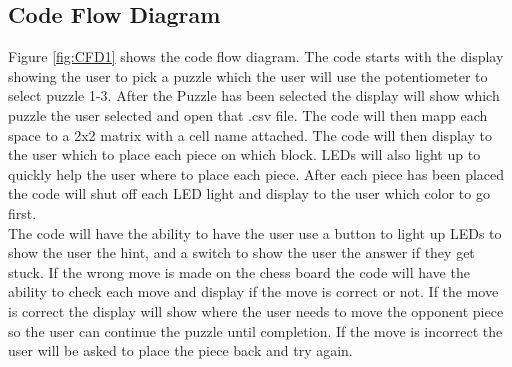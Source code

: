 \documentclass[11pt]{article}
\begin{document}
\subsection{Code Flow Diagram}
Figure \ref{fig:CFD1} shows the code flow diagram. The code starts with the display showing the user to pick a puzzle which the user will use the potentiometer to select puzzle 1-3. After the Puzzle has been selected the display will show which puzzle the user selected and open that .csv file. The code will then mapp each space to a 2x2 matrix with a cell name attached. The code will then display to the user which to place each piece on which block. LEDs will also light up to quickly help the user where to place each piece. After each piece has been placed the code will shut off each LED light and display to the user which color to go first.  
\\


\noindent The code will have the ability to have the user use a button to light up LEDs to show the user the hint, and a switch to show the user the answer if they get stuck. If the wrong move is made on the chess board the code will have the ability to check each move and display if the move is correct or not. If the move is correct the display will show where the user needs to move the opponent piece so the user can continue the puzzle until completion. If the move is incorrect the user will be asked to place the piece back and try again. 
\end{document}
